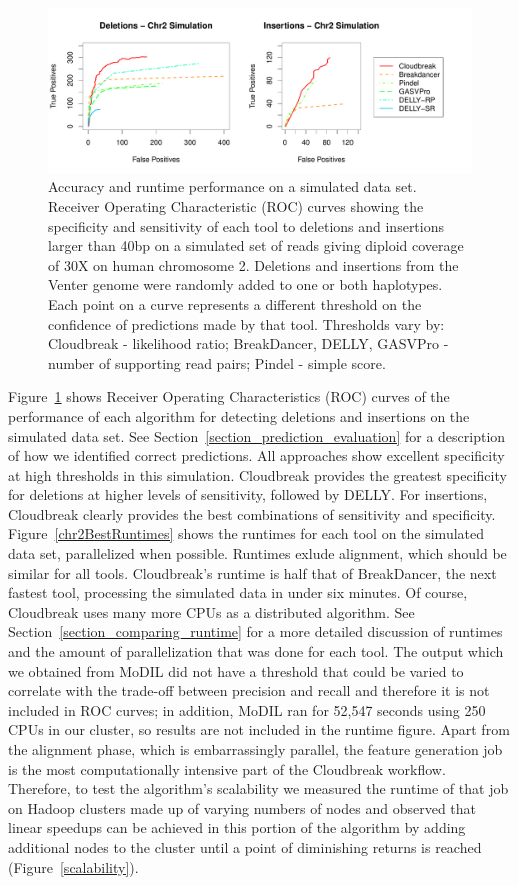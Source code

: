 \begin{figure}
\centering
\includegraphics[width=1\textwidth]{figures/CHR2SIM_ROC_COMBINED_ROCS_POSTER.pdf}
\caption{Accuracy and runtime performance on a simulated data set. Receiver Operating Characteristic (ROC) curves showing the specificity and sensitivity of each tool to deletions and insertions larger than 40bp on a simulated set of reads giving diploid coverage of 30X on human chromosome 2. Deletions and insertions from the Venter genome were randomly added to one or both haplotypes. Each point on a curve represents a different threshold on the confidence of predictions made by that tool. Thresholds vary by: Cloudbreak - likelihood ratio; BreakDancer, DELLY, GASVPro - number of supporting read pairs; Pindel - simple score.}
\label{chr2CombinedRoc}
\end{figure}

Figure~\ref{chr2CombinedRoc} shows Receiver Operating Characteristics (ROC) curves of the performance of each algorithm for detecting deletions and insertions on the simulated data set. See Section~\ref{section_prediction_evaluation} for a description of how we identified correct predictions. All approaches show excellent specificity at high thresholds in this simulation. Cloudbreak provides the greatest specificity for deletions at higher levels of sensitivity, followed by DELLY. For insertions, Cloudbreak clearly provides the best combinations of sensitivity and specificity. Figure~\ref{chr2BestRuntimes} shows the runtimes for each tool on the simulated data set, parallelized when possible. Runtimes exlude alignment, which should be similar for all tools. Cloudbreak's runtime is half that of BreakDancer, the next fastest tool, processing the simulated data in under six minutes. Of course, Cloudbreak uses many more CPUs as a distributed algorithm. See Section~\ref{section_comparing_runtime} for a more detailed discussion of runtimes and the amount of parallelization that was done for each tool. The output which we obtained from MoDIL did not have a threshold that could be varied to correlate with the trade-off between precision and recall and therefore it is not included in ROC curves; in addition, MoDIL ran for 52,547 seconds using 250 CPUs in our cluster, so results are not included in the runtime figure. Apart from the alignment phase, which is embarrassingly parallel, the feature generation job is the most computationally intensive part of the Cloudbreak workflow. Therefore, to test the algorithm's scalability we measured the runtime of that job on Hadoop clusters made up of varying numbers of nodes and observed that linear speedups can be achieved in this portion of the algorithm by adding additional nodes to the cluster until a point of diminishing returns is reached (Figure~\ref{scalability}).

